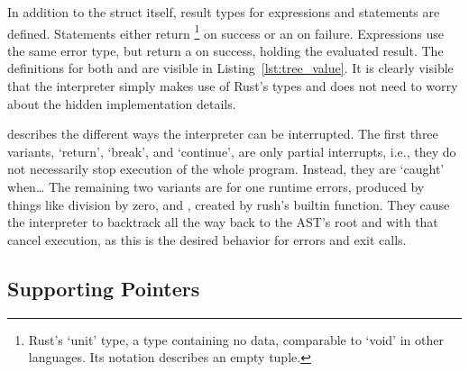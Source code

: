 In addition to the struct itself, result types for expressions and statements are defined.
Statements either return \qVerb{()}\footnote{Rust's `unit' type, a type containing no data, comparable to `void' in other languages. Its notation describes an empty tuple.} on success or an  on failure.
Expressions use the same error type, but return a  on success, holding the evaluated result.
The definitions for both  and  are visible in Listing~\ref{lst:tree_value}.
It is clearly visible that the interpreter simply makes use of Rust's types and does not need to worry about the hidden implementation details.


 describes the different ways the interpreter can be interrupted.
The first three variants, `return', `break', and `continue', are only partial interrupts, i.e., they do not necessarily stop execution of the whole program.
Instead, they are `caught' when\ldots
The remaining two variants are for one runtime errors, produced by things like division by zero, and , created by rush's builtin  function.
They cause the interpreter to backtrack all the way back to the AST's root and with that cancel execution, as this is the desired behavior for errors and exit calls.

\subsection{Supporting Pointers}\label{sec:tree_pointers}

